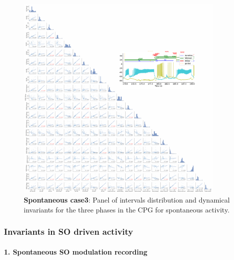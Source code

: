 \begin{figure}[htbp]
	\centering
	\includegraphics[width=0.9\textwidth]{./invariants/data/SUSSEX/prep3/images/3phases/panel_with_pairplot.pdf}
	\caption{\textbf{Spontaneous case3}: Panel of intervals distribution and dynamical invariants for the three phases in the CPG for spontaneous activity.}
	\label{fig:prep3 invariants pairplot}
\end{figure}


\subsubsection{Invariants in SO driven activity}
\paragraph{1. Spontaneous SO modulation recording}
 
